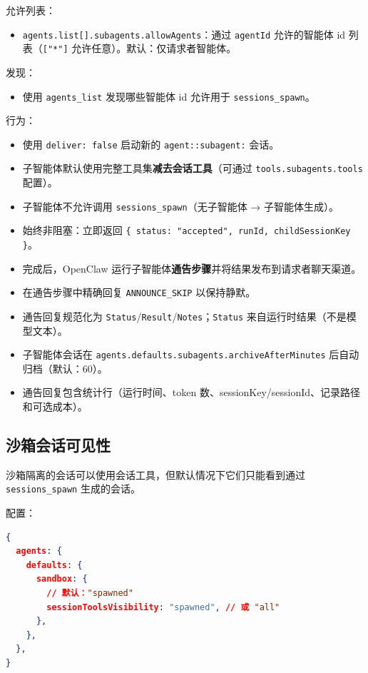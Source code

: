 允许列表：

\begin{itemize}
  \item \texttt{agents.list[].subagents.allowAgents}：通过 \texttt{agentId} 允许的智能体 id 列表（\texttt{["*"]} 允许任意）。默认：仅请求者智能体。
\end{itemize}


发现：

\begin{itemize}
  \item 使用 \texttt{agents\_list} 发现哪些智能体 id 允许用于 \texttt{sessions\_spawn}。
\end{itemize}


行为：

\begin{itemize}
  \item 使用 \texttt{deliver: false} 启动新的 \texttt{agent::subagent:} 会话。
  \item 子智能体默认使用完整工具集\textbf{减去会话工具}（可通过 \texttt{tools.subagents.tools} 配置）。
  \item 子智能体不允许调用 \texttt{sessions\_spawn}（无子智能体 → 子智能体生成）。
  \item 始终非阻塞：立即返回 \texttt{\{ status: "accepted", runId, childSessionKey \}}。
  \item 完成后，OpenClaw 运行子智能体\textbf{通告步骤}并将结果发布到请求者聊天渠道。
  \item 在通告步骤中精确回复 \texttt{ANNOUNCE\_SKIP} 以保持静默。
  \item 通告回复规范化为 \texttt{Status}/\texttt{Result}/\texttt{Notes}；\texttt{Status} 来自运行时结果（不是模型文本）。
  \item 子智能体会话在 \texttt{agents.defaults.subagents.archiveAfterMinutes} 后自动归档（默认：60）。
  \item 通告回复包含统计行（运行时间、token 数、sessionKey/sessionId、记录路径和可选成本）。
\end{itemize}


\subsection{沙箱会话可见性}


沙箱隔离的会话可以使用会话工具，但默认情况下它们只能看到通过 \texttt{sessions\_spawn} 生成的会话。

配置：

\begin{lstlisting}[language=json]
{
  agents: {
    defaults: {
      sandbox: {
        // 默认："spawned"
        sessionToolsVisibility: "spawned", // 或 "all"
      },
    },
  },
}
\end{lstlisting}



